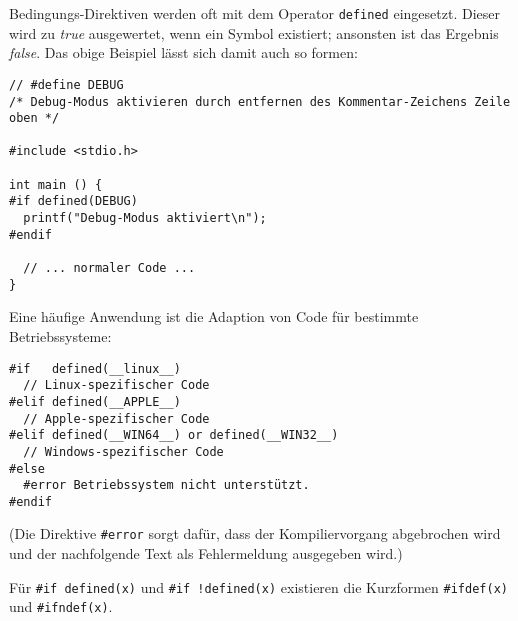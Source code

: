 Bedingungs-Direktiven werden oft mit dem Operator \texttt{defined} eingesetzt. Dieser wird zu \emph{true} ausgewertet, wenn ein Symbol existiert; ansonsten ist das Ergebnis \emph{false}. Das obige Beispiel lässt sich damit auch so formen:

\begin{codebox}
\begin{verbatim}
// #define DEBUG
/* Debug-Modus aktivieren durch entfernen des Kommentar-Zeichens Zeile oben */

#include <stdio.h>

int main () {
#if defined(DEBUG)
  printf("Debug-Modus aktiviert\n");
#endif
  
  // ... normaler Code ...
}   
\end{verbatim}
\end{codebox}

Eine häufige Anwendung ist die Adaption von Code für bestimmte Betriebssysteme:

\begin{codebox}
\begin{verbatim}
#if   defined(__linux__)
  // Linux-spezifischer Code
#elif defined(__APPLE__)
  // Apple-spezifischer Code
#elif defined(__WIN64__) or defined(__WIN32__)
  // Windows-spezifischer Code
#else
  #error Betriebssystem nicht unterstützt.
#endif
\end{verbatim}
\end{codebox}

(Die Direktive \texttt{#error} sorgt dafür, dass der Kompiliervorgang abgebrochen wird und der nachfolgende Text als Fehlermeldung ausgegeben wird.)

Für \texttt{#if defined(x)} und \texttt{#if !defined(x)} existieren die Kurzformen \texttt{#ifdef(x)} und \texttt{#ifndef(x)}.


